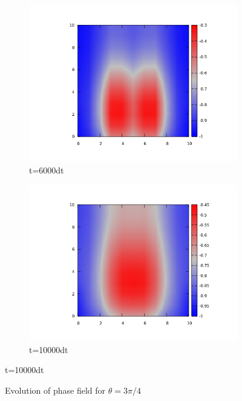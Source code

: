 \documentclass{article}
\begin{document}
\begin{figure}
\centering
\begin{subfigure}{.5\textwidth}
  \centering
  \includegraphics[width=1.0\linewidth]{6000contact3p4.png}
  \caption{t=6000dt}
  \label{fig:sub1}
\end{subfigure}%
\begin{subfigure}{.5\textwidth}
  \centering
  \includegraphics[width=1.0\linewidth]{10000contact3p4.png}
  \caption{t=10000dt}
  \label{fig:sub2}
\end{subfigure}
\label{fig:test}
\end{figure}
\begin{figure}
\caption {Evolution of phase field for $\theta = 3\pi/4$ }
\end{figure}
\end{document}
